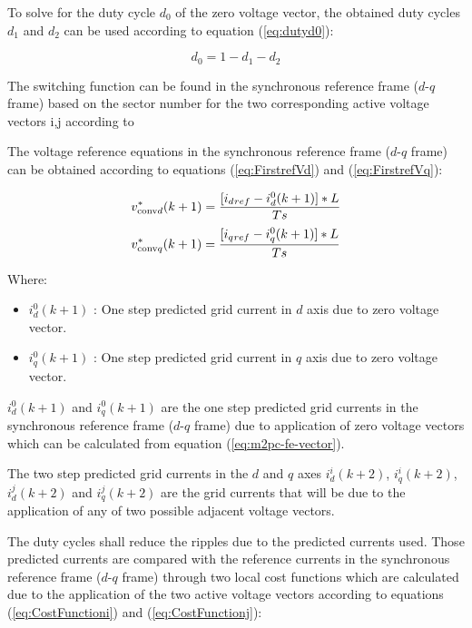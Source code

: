 To solve for the duty cycle $d_0$ of the zero voltage vector, the obtained duty cycles $d_1$ and $d_2$ can be used according to equation (\ref{eq:dutyd0}):

\begin{equation}
	d_0 = 1 - d_1 - d_2
	\label{eq:dutyd0}
\end{equation}

The switching function can be found in the synchronous reference frame ($d$-$q$ frame) based on the sector number for the two corresponding active voltage vectors i,j according to\cite{Mohamed2012}

The voltage reference equations in the synchronous reference frame ($d$-$q$ frame) can be obtained according to equations (\ref{eq:FirstrefVd}) and (\ref{eq:FirstrefVq}):

\begin{equation}
	v^{*}_{\mathrm{conv}d}(k+1) =  \frac{[i_d{}_{ref} - i^{0}_d(k+1)]*L}{Ts}  \\
	\label{eq:FirstrefVd}
\end{equation}
\begin{equation}
	v^{*}_{\mathrm{conv}q}(k+1) =  \frac{[i_q{}_{ref} - i^{0}_q(k+1)]*L}{Ts}  \\
	\label{eq:FirstrefVq}
\end{equation}

\noindent Where:
\begin{itemize}
	\item $i^{0}_{d}(k+1)$ : One step predicted grid current in $d$ axis due to zero voltage vector.
	\item $i^{0}_{q}(k+1)$ : One step predicted grid current in $q$ axis due to zero voltage vector.
\end{itemize}

$i^{0}_{d}(k+1)$ and $i^{0}_{q}(k+1)$ are the one step predicted grid currents in the synchronous reference frame ($d$-$q$ frame) due to application of zero voltage vectors which can be calculated from equation (\ref{eq:m2pc-fe-vector}).

The two step predicted grid currents in the $d$ and $q$ axes $i^{i}_{d}(k+2)$, $i^{i}_{q}(k+2)$, $i^{j}_{d}(k+2)$ and $i^{j}_{q}(k+2)$ are the grid currents that will be due to the application of any of two possible adjacent voltage vectors. 

The duty cycles shall reduce the ripples due to the predicted currents used. Those predicted currents are compared with the reference currents in the synchronous reference frame ($d$-$q$ frame) through two local cost functions which are calculated 
due to the application of the two active voltage vectors according to equations (\ref{eq:CostFunctioni}) and (\ref{eq:CostFunctionj}):

